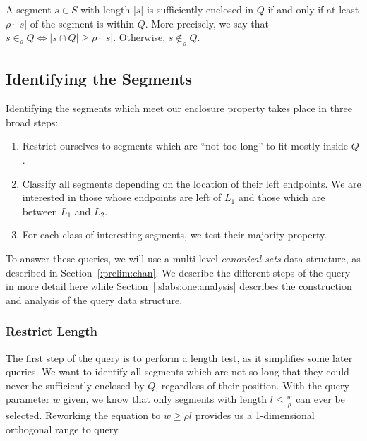A segment $s \in S$ with length $|s|$ is sufficiently enclosed in $Q$ if and only if at least $\rho \cdot |s|$ of the segment is within $Q$. More precisely, we say that $s \in_\rho Q \Leftrightarrow |s \cap Q| \geq \rho \cdot |s|$. Otherwise, $s \not \in_\rho Q$.


\subsection{Identifying the Segments}
\label{:slabs:one:approach}

Identifying the segments which meet our enclosure property takes place in three broad steps:

\begin{enumerate}
 \item Restrict ourselves to segments which are ``not too long'' to fit mostly inside $Q$.

 \item Classify all segments depending on the location of their left endpoints. We are interested in those whose endpoints are left of $L_1$ and those which are between $L_1$ and $L_2$.

 \item For each class of interesting segments, we test their majority property.

\end{enumerate}

To answer these queries, we will use a multi-level \emph{canonical sets} data structure, as described in Section~\ref{:prelim:chan}. We describe the different steps of the query in more detail here while Section~\ref{:slabs:one:analysis} describes the construction and analysis of the query data structure.


\subsubsection{Restrict Length}
\label{:slabs:one:details:restrict}

The first step of the query is to perform a length test, as it simplifies some later queries.  We want to identify all segments which are not so long that they could never be sufficiently enclosed by $Q$, regardless of their position. With the query parameter $w$ given, we know that only segments with length $l \leq \frac{w}{\rho}$ can ever be selected. Reworking the equation to $w \geq \rho l$ provides us a 1-dimensional orthogonal range to query.


